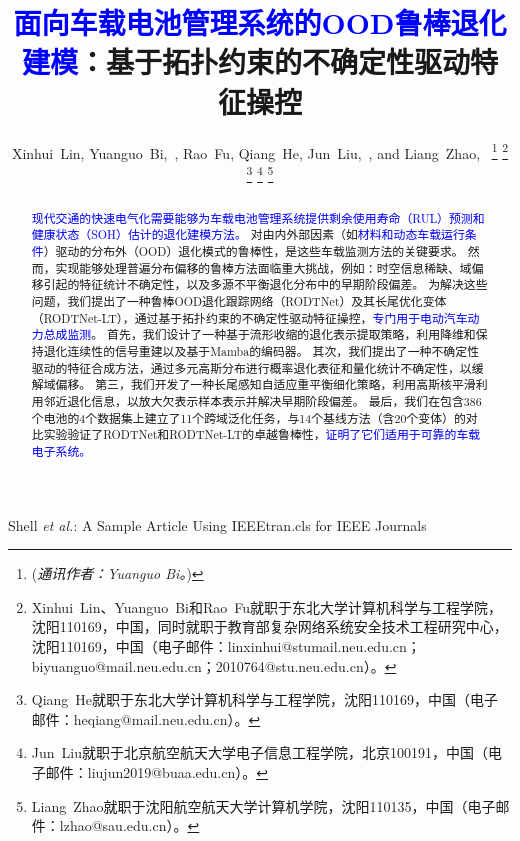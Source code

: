 \documentclass[UTF8,lettersize,journal]{IEEEtran}
\newcommand{\rev}[1]{\textcolor{blue}{#1}}
\begin{document}
\title{\rev{面向车载电池管理系统的OOD鲁棒退化建模}：基于拓扑约束的不确定性驱动特征操控}

\author{
    Xinhui~Lin,
    Yuanguo~Bi,~,
    Rao~Fu,
    Qiang~He,
    Jun~Liu,~,
    and Liang~Zhao,~
    \vspace{-1.5em}
\thanks{(\emph{通讯作者：Yuanguo Bi。})}
\thanks{Xinhui~Lin、Yuanguo~Bi和Rao~Fu就职于东北大学计算机科学与工程学院，沈阳110169，中国，同时就职于教育部复杂网络系统安全技术工程研究中心，沈阳110169，中国（电子邮件：linxinhui@stumail.neu.edu.cn；biyuanguo@mail.neu.edu.cn；2010764@stu.neu.edu.cn）。}
\thanks{Qiang~He就职于东北大学计算机科学与工程学院，沈阳110169，中国（电子邮件：heqiang@mail.neu.edu.cn）。}
\thanks{Jun~Liu就职于北京航空航天大学电子信息工程学院，北京100191，中国（电子邮件：liujun2019@buaa.edu.cn）。}
\thanks{Liang~Zhao就职于沈阳航空航天大学计算机学院，沈阳110135，中国（电子邮件：lzhao@sau.edu.cn）。}
}

%
{Shell \MakeLowercase{\textit{et al.}}: A Sample Article Using IEEEtran.cls for IEEE Journals}


\maketitle

\begin{abstract}
\rev{现代交通的快速电气化需要能够为车载电池管理系统提供剩余使用寿命（RUL）预测和健康状态（SOH）估计的退化建模方法。}
对由内外部因素（如\rev{材料和动态车载运行条件}）驱动的分布外（OOD）退化模式的鲁棒性，是这些车载监测方法的关键要求。
% 
然而，实现能够处理普遍分布偏移的鲁棒方法面临重大挑战，例如：时空信息稀缺、域偏移引起的特征统计不确定性，以及多源不平衡退化分布中的早期阶段偏差。
为解决这些问题，我们提出了一种鲁棒OOD退化跟踪网络（RODTNet）及其长尾优化变体（RODTNet-LT），通过基于拓扑约束的不确定性驱动特征操控，\rev{专门用于电动汽车动力总成监测}。
% 
首先，我们设计了一种基于流形收缩的退化表示提取策略，利用降维和保持退化连续性的信号重建以及基于Mamba的编码器。
%
其次，我们提出了一种不确定性驱动的特征合成方法，通过多元高斯分布进行概率退化表征和量化统计不确定性，以缓解域偏移。
%
第三，我们开发了一种长尾感知自适应重平衡细化策略，利用高斯核平滑利用邻近退化信息，以放大欠表示样本表示并解决早期阶段偏差。
%
最后，我们在包含386个电池的4个数据集上建立了11个跨域泛化任务，与14个基线方法（含20个变体）的对比实验验证了RODTNet和RODTNet-LT的卓越鲁棒性，\rev{证明了它们适用于可靠的车载电子系统。}
\end{abstract}
\end{document}
